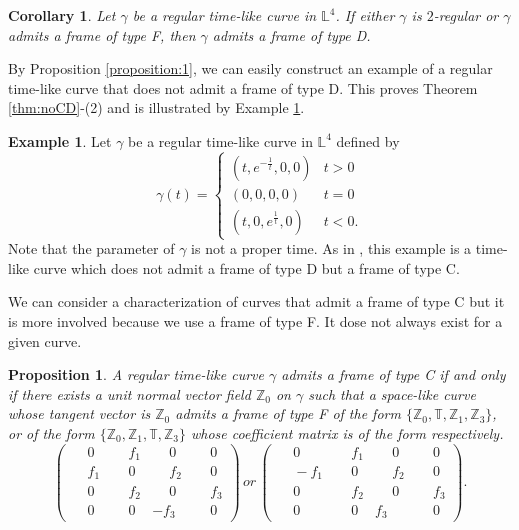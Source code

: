 \documentclass[a4paper]{amsart}
\newtheorem{corollary}[theorem]{Corollary}
\newtheorem{proposition}[theorem]{Proposition}
\theoremstyle{definition}
\newtheorem{example}[theorem]{Example}
\theoremstyle{remark}
\newcommand{\TT}{\mathbb{T}}
\newcommand{\ZZ}{\mathbb{Z}}
\newcommand{\LL}{\mathbb{L}}
\numberwithin{equation}{section}
\begin{document}
\begin{corollary}\label{cor:2regD}
Let $\gamma$ be a regular time-like curve in $\LL^4$. If either $\gamma$ is $2$-regular or $\gamma$ admits a frame of type F, then $\gamma$ admits a frame of type D.
\end{corollary}
By Proposition \ref{proposition:1}, we can easily construct an example of a regular time-like curve that does not admit a frame of type D. This proves Theorem \ref{thm:noCD}-(2) and is illustrated by Example \ref{ex:noD}.
\begin{example}\label{ex:noD}
Let $\gamma$ be a regular time-like curve in $\LL^{4}$ defined by
\begin{equation}\label{eq:gamma}
\gamma(t)=
\begin{cases}(t, e^{-\frac{1}{t}},0,0) & t>0\\
(0, 0, 0, 0) & t=0\\
(t,0, e^{\frac{1}{t}},0) & t<0.
\end{cases}
\end{equation}
Note that the parameter of $\gamma$ is not a proper time. As in \cite{NN}, this example is a time-like curve which does not admit a frame of type D but a frame of type C.
\end{example}

We can consider a characterization of curves that admit a frame of type C but it is more involved because we use a frame of type F. It dose not always exist for a given curve.

\begin{proposition}\label{prop:charC}
A regular time-like curve $\gamma$ admits a frame of type C if and only if there exists a unit normal vector field $\ZZ_{0}$ on $\gamma$ such that a space-like curve whose tangent vector is $\ZZ_{0}$ admits a frame of type F of the form $\{\ZZ_{0}, \TT, \ZZ_{1}, \ZZ_{3}\}$, or of the form $\{\ZZ_{0}, \ZZ_{1}, \TT, \ZZ_{3}\}$
whose coefficient matrix is of the form respectively.
\begin{equation*}\label{eq:frenet}
\begin{pmatrix}
\phantom{-}0&\phantom{-}f_{1}&\phantom{-}0&\phantom{-}0\\
\phantom{-}f_{1}&\phantom{-}0&\phantom{-}f_{2}&\phantom{-}0\\
\phantom{-}0&\phantom{-}f_{2}&\phantom{-}0&\phantom{-}f_{3}\\
\phantom{-}0&\phantom{-}0&-f_{3}&\phantom{-}0
\end{pmatrix}\,or\,\begin{pmatrix}
\phantom{-}0&\phantom{-}f_{1}&\phantom{-}0&\phantom{-}0\\
\phantom{-}-f_{1}&\phantom{-}0&\phantom{-}f_{2}&\phantom{-}0\\
\phantom{-}0&\phantom{-}f_{2}&\phantom{-}0&\phantom{-}f_{3}\\
\phantom{-}0&\phantom{-}0&f_{3}&\phantom{-}0
\end{pmatrix}.
\end{equation*}
\end{proposition}
\end{document}
